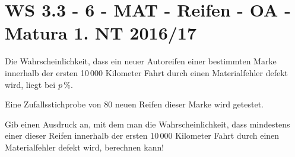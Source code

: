 \section{WS 3.3 - 6 - MAT - Reifen - OA - Matura 1. NT 2016/17}

\begin{beispiel}[WS 3.3]{1} %
Die Wahrscheinlichkeit, dass ein neuer Autoreifen einer bestimmten Marke innerhalb der ersten 10\,000 Kilometer Fahrt durch einen Materialfehler defekt wird, liegt bei $p\,\%$.

Eine Zufallsstichprobe von 80 neuen Reifen dieser Marke wird getestet.

Gib einen Ausdruck an, mit dem man die Wahrscheinlichkeit, dass mindestens einer dieser Reifen innerhalb der ersten 10\,000 Kilometer Fahrt durch einen Materialfehler defekt wird, berechnen kann!

\end{beispiel}